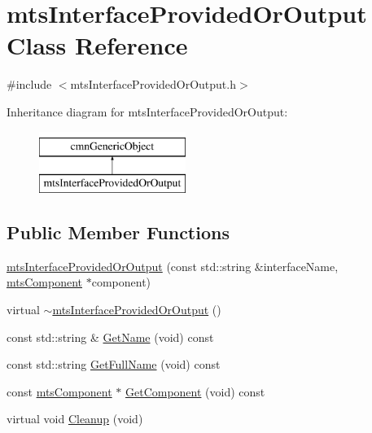 \hypertarget{classmts_interface_provided_or_output}{\section{mts\-Interface\-Provided\-Or\-Output Class Reference}
\label{classmts_interface_provided_or_output}
}


{\ttfamily \#include $<$mts\-Interface\-Provided\-Or\-Output.\-h$>$}

Inheritance diagram for mts\-Interface\-Provided\-Or\-Output\-:\begin{figure}[H]
\begin{center}
\leavevmode
\includegraphics[height=2.000000cm]{d8/dfb/classmts_interface_provided_or_output}
\end{center}
\end{figure}
\subsection*{Public Member Functions}
\begin{DoxyCompactItemize}
\item 
\hyperlink{classmts_interface_provided_or_output_a9d5aa45e318eb16a6e6afdcf688efbda}{mts\-Interface\-Provided\-Or\-Output} (const std\-::string \&interface\-Name, \hyperlink{classmts_component}{mts\-Component} $\ast$component)
\item 
virtual \hyperlink{classmts_interface_provided_or_output_a4953dec717e3348fdef378fae9232d99}{$\sim$mts\-Interface\-Provided\-Or\-Output} ()
\item 
const std\-::string \& \hyperlink{classmts_interface_provided_or_output_abb27c5aa42f5455c63a66d8f986fadb2}{Get\-Name} (void) const 
\item 
const std\-::string \hyperlink{classmts_interface_provided_or_output_a1f1f631e3d1985e128ef2ee2d39966ef}{Get\-Full\-Name} (void) const 
\item 
const \hyperlink{classmts_component}{mts\-Component} $\ast$ \hyperlink{classmts_interface_provided_or_output_ab98232c55ca1a9a34db8617e88c384fa}{Get\-Component} (void) const 
\item 
virtual void \hyperlink{classmts_interface_provided_or_output_a01881e22671baa8b2d291491b907395a}{Cleanup} (void)
\end{DoxyCompactItemize}
